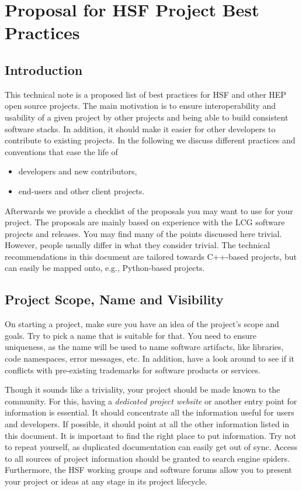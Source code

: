 \documentclass[12pt,a4paper]{article}
\providecommand{\tightlist}{%
  \setlength{\itemsep}{0pt}\setlength{\parskip}{0pt}}
\begin{document}
\section{Proposal for HSF Project Best
Practices}\label{proposal-for-hsf-project-best-practices}

\subsection{Introduction}\label{introduction}

This technical note is a proposed list of best practices for HSF and
other HEP open source projects. The main motivation is to ensure
interoperability and usability of a given project by other projects and
being able to build consistent software stacks. In addition, it should
make it easier for other developers to contribute to existing projects.
In the following we discuss different practices and conventions that
ease the life of

\begin{itemize}
\tightlist
\item
  developers and new contributors,
\item
  end-users and other client projects.
\end{itemize}

Afterwards we provide a checklist of the proposals you may want to use
for your project. The proposals are mainly based on experience with the
LCG software projects and releases. You may find many of the points
discussed here trivial. However, people usually differ in what they
consider trivial. The technical recommendations in this document are
tailored towards C++-based projects, but can easily be mapped onto,
e.g., Python-based projects.

\subsection{Project Scope, Name and
Visibility}\label{project-scope-name-and-visibility}

On starting a project, make sure you have an idea of the project's scope
and goals. Try to pick a name that is suitable for that. You need to
ensure uniqueness, as the name will be used to name software artifacts,
like libraries, code namespaces, error messages, etc. In addition, have
a look around to see if it conflicts with pre-existing trademarks for
software products or services.

Though it sounds like a triviality, your project should be made known to
the community. For this, having a \emph{dedicated project website} or
another entry point for information is essential. It should concentrate
all the information useful for users and developers. If possible, it
should point at all the other information listed in this document. It is
important to find the right place to put information. Try not to repeat
yourself, as duplicated documentation can easily get out of sync. Access
to all sources of project information should be granted to search engine
spiders. Furthermore, the HSF working groups and software forums allow
you to present your project or ideas at any stage in its project
lifecycle.
\end{document}
